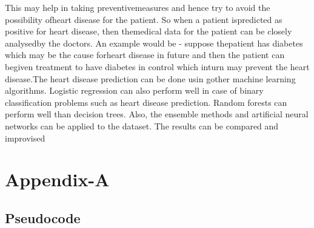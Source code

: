 \documentclass[oneside,12pt]{Classes/VTU}
\begin{document}
	 This may help in taking preventivemeasures and hence try to avoid the possibility ofheart disease for the patient. So when a patient ispredicted  as  positive  for  heart  disease,  then  themedical data for the patient can be closely analysedby the doctors. An example would be - suppose thepatient  has  diabetes  which may  be  the cause   forheart disease in future and  then the patient can begiven treatment to have diabetes in control which inturn may prevent the heart disease.The  heart  disease  prediction  can  be   done  usin gother   machine   learning   algorithms. Logistic regression can also perform well in case of binary classification   problems   such   as   heart   disease prediction. Random forests can  perform well than decision  trees.   Also, the  ensemble  methods   and artificial neural networks can be applied to the dataset. The results can be compared and improvised
	
	\chapter*{Appendix-A}
	\section*{Pseudocode} 
	
\end{document}
